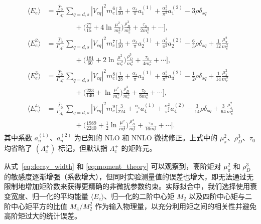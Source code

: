 \begin{equation}\label{eq:moment_theory}
\begin{aligned}
\langle E_e\rangle &= \frac{\hat\Gamma_0}{\Gamma_{\Lambda_c^+}} \sum_{q=d,s} |V_{cq}|^2 m_c^6 \Big[ \frac{3}{10} + \frac{\alpha_s}{\pi} a_1^{(1)} + \frac{\alpha_s^2}{\pi^2} a_1^{(2)} - 3\rho\delta_{sq} \\
&\qquad\qquad + \Big(\frac{77}{15} + 4\ln\frac{\mu^2}{m_c^2}\Big)\frac{\rho_D^3}{m_c^3} + \frac{\tau_0}{2m_c^3} + \cdots \Big] , \\
\langle E_e^2\rangle &= \frac{\hat\Gamma_0}{\Gamma_{\Lambda_c^+}} \sum_{q=d,s} |V_{cq}|^2 m_c^7 \Big[ \frac{1}{10} + \frac{\alpha_s}{\pi} a_2^{(1)} + \frac{\alpha_s^2}{\pi^2} a_2^{(2)} - \frac{6}{5}\rho\delta_{sq} + \frac{1}{12}\frac{\mu_\pi^2}{m_c^2} \\
&\qquad\qquad + \Big(\frac{181}{60} + 2\ln\frac{\mu^2}{m_c^2}\Big)\frac{\rho_D^3}{m_c^3} + \frac{\tau_0}{4m_c^3} + \cdots \Big] , \\
\langle E_e^3\rangle &= \frac{\hat\Gamma_0}{\Gamma_{\Lambda_c^+}} \sum_{q=d,s} |V_{cq}|^2 m_c^8 \Big[ \frac{1}{28} + \frac{\alpha_s}{\pi} a_3^{(1)} + \frac{\alpha_s^2}{\pi^2} a_3^{(2)} - \frac{1}{2}\rho\delta_{sq} + \frac{1}{14}\frac{\mu_\pi^2}{m_c^2} \\
&\qquad\qquad + \Big(\frac{233}{140} + \ln\frac{\mu^2}{m_c^2}\Big)\frac{\rho_D^3}{m_c^3} + \frac{\tau_0}{8m_c^3} + \cdots \Big] , \\
\langle E_e^4\rangle &= \frac{\hat\Gamma_0}{\Gamma_{\Lambda_c^+}} \sum_{q=d,s} |V_{cq}|^2 m_c^9 \Big[ \frac{3}{224} + \frac{\alpha_s}{\pi} a_4^{(1)} + \frac{\alpha_s^2}{\pi^2} a_4^{(2)} - \frac{3}{14}\rho\delta_{sq} + \frac{3}{64}\frac{\mu_\pi^2}{m_c^2} \\
&\qquad\qquad + \Big(\frac{1989}{2240} + \frac{1}{2}\ln\frac{\mu^2}{m_c^2}\Big)\frac{\rho_D^3}{m_c^3} + \frac{\tau_0}{16m_c^3} + \cdots \Big] .
\end{aligned}
\end{equation}
其中系数 $a_n^{(1)}$、$a_n^{(2)}$ 为已知的 NLO 和 NNLO 微扰修正\cite{Shao:2025vhe}。上式中的 $\mu_\pi^2$、$\rho_D^3$、$\tau_0$ 均省略了 $(\Lambda_c^+)$ 标记，但默认指 $\Lambda_c^+$ 的矩阵元。

从式~\eqref{eq:decay_width} 和 \eqref{eq:moment_theory} 可以观察到，高阶矩对 $\mu_\pi^2$ 和 $\rho_D^3$ 的敏感度逐渐增强（系数增大），但同时实验测量值的误差也增大，即无法通过无限制地增加矩阶数来获得更精确的非微扰参数约束。实际拟合中，我们选择使用衰变宽度、归一化的平均能量 $\langle E_e \rangle$、归一化的二阶中心矩 $M_2$ 以及四阶中心矩与二阶中心矩平方的比值 $M_4/M_2^2$ 作为输入物理量，以充分利用矩之间的相关性并避免高阶矩过大的统计误差。


